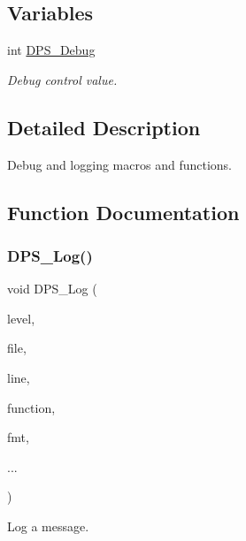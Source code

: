 \subsection*{Variables}
\begin{DoxyCompactItemize}
\item 
\mbox{\label{group__debug_ga6f4bedbcc8b3bd12cea20b5ce3a8abba}} 
int \hyperlink{group__debug_ga6f4bedbcc8b3bd12cea20b5ce3a8abba}{D\+P\+S\+\_\+\+Debug}
\begin{DoxyCompactList}\small\item\em Debug control value. \end{DoxyCompactList}\end{DoxyCompactItemize}


\subsection{Detailed Description}
Debug and logging macros and functions. 



\subsection{Function Documentation}
\mbox{\label{group__debug_ga174fef61dca16376546e570c9b831502}} 
\subsubsection{\texorpdfstring{D\+P\+S\+\_\+\+Log()}{DPS\_Log()}}
{\footnotesize\ttfamily void D\+P\+S\+\_\+\+Log (\begin{DoxyParamCaption}\item[{\hyperlink{group__debug_gad06c0421a8226b0a95be1d722ca05612}{D\+P\+S\+\_\+\+Log\+Level}}]{level,  }\item[{const char $\ast$}]{file,  }\item[{int}]{line,  }\item[{const char $\ast$}]{function,  }\item[{const char $\ast$}]{fmt,  }\item[{}]{... }\end{DoxyParamCaption})}



Log a message. 


